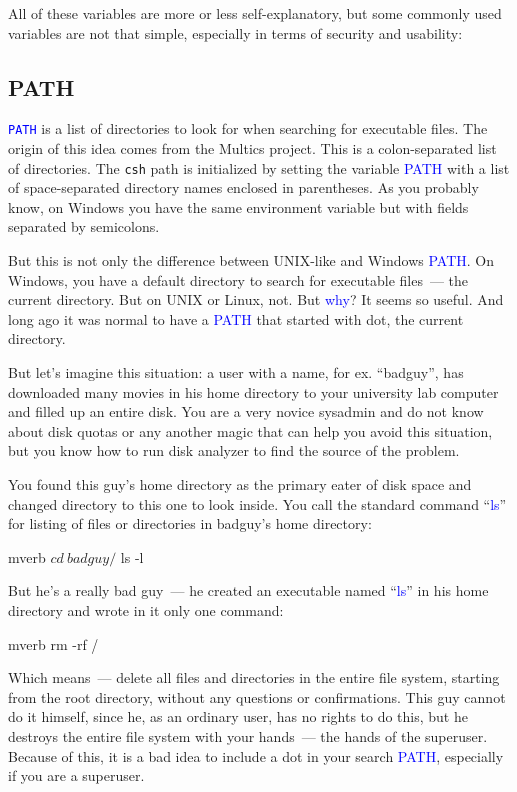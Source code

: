 \documentclass[12pt]{report}
\newcommand{\struct}[1]{\textcolor{blue}{#1}}
\newcommand{\cmd}[1]{\textcolor{blue}{#1}}
\begin{document}
\medskip
All of these variables are more or less self-explanatory, but some
commonly used variables are not that simple, especially in terms of
security and usability:

\subsection*{PATH}

\struct{\tt PATH} is a list of directories to look for when searching for
executable files. The origin of this idea comes from the Multics project.
This is a colon-separated list of directories. The \verb|csh| path is
initialized by setting the variable \cmd{PATH} with a list of space-separated
directory names enclosed in parentheses. As you probably know, on Windows
you have the same environment variable but with fields separated by semicolons.

\medskip
But this is not only the difference between UNIX-like and Windows \cmd{PATH}.
On Windows, you have a default directory to search for executable files~---
the current directory. But on UNIX or Linux, not. But \struct{why}?
It seems so useful. And long ago it was normal to have a \cmd{PATH} that
started with dot, the current directory.

\medskip
But let's imagine this situation: a user with a name, for ex. ``badguy'',
has downloaded many movies in his home directory to your university lab computer
and filled up an entire disk. You are a very novice sysadmin and do not know
about disk quotas or any another magic that can help you avoid this situation,
but you know how to run disk analyzer to find the source of the problem.

\medskip
You found this guy's home directory as the primary eater of disk space and
changed directory to this one to look inside. You call the standard command
``\cmd{ls}'' for listing of files or directories in badguy's home directory:
\begin{code}{mverb}
$ cd ~badguy/
$ ls -l
\end{code}

\medskip
But he's a really bad guy~--- he created an executable named ``\cmd{ls}''
in his home directory and wrote in it only one command:
\begin{code}{mverb}
rm -rf /
\end{code}
Which means~--- delete all files and directories in the entire file system,
starting from the root directory, without any questions or confirmations.
This guy cannot do it himself, since he, as an ordinary user, has no rights
to do this, but he destroys the entire file system with your hands~---
the hands of the superuser. Because of this, it is a bad idea to include
a dot in your search \cmd{PATH}, especially if you are a superuser.
\end{document}
